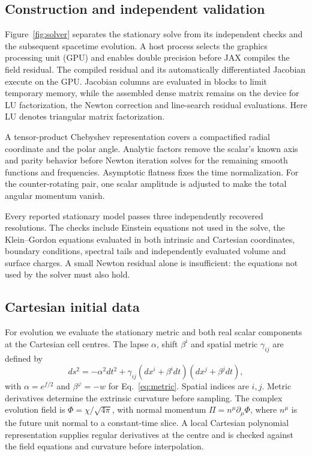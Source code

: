 \documentclass[10pt,twocolumn,floatfix,aps,prd,superscriptaddress,nofootinbib]{revtex4-2}
\begin{document}
\subsection{Construction and independent validation}

Figure~\ref{fig:solver} separates the stationary solve from its independent
checks and the subsequent spacetime evolution. A host process selects the
graphics processing unit (GPU) and enables double precision before JAX
compiles the field residual. The compiled residual and its automatically
differentiated Jacobian execute on the GPU. Jacobian columns are evaluated
in blocks to limit temporary memory, while the assembled dense matrix remains
on the device for LU factorization, the Newton correction and line-search
residual evaluations. Here LU denotes triangular matrix factorization.

A tensor-product Chebyshev representation covers a compactified radial
coordinate and the polar angle. Analytic factors remove the scalar's known
axis and parity behavior before Newton iteration solves for the remaining
smooth functions and frequencies. Asymptotic flatness fixes the time
normalization. For the counter-rotating pair, one scalar amplitude is adjusted
to make the total angular momentum vanish.

Every reported stationary model passes three independently recovered
resolutions. The checks include Einstein equations not used in the solve,
the Klein--Gordon equations evaluated in both intrinsic and Cartesian
coordinates, boundary conditions, spectral tails and independently evaluated
volume and surface charges. A small Newton residual alone is insufficient:
the equations not used by the solver must also hold.



\subsection{Cartesian initial data}

For evolution we evaluate the stationary metric and both real scalar
components at the Cartesian cell centres. The lapse $\alpha$, shift
$\beta^i$ and spatial metric $\gamma_{ij}$ are defined by
\begin{equation}
 ds^2=-\alpha^2dt^2+\gamma_{ij}(dx^i+\beta^idt)(dx^j+\beta^jdt),
 \label{eq:threeplusone}
\end{equation}
with $\alpha=e^{f/2}$ and $\beta^\varphi=-w$ for Eq.~\eqref{eq:metric}.
Spatial indices are $i,j$. Metric derivatives determine the extrinsic
curvature before sampling. The complex evolution field is
$\Phi=\chi/\sqrt{4\pi}$, with normal momentum
$\Pi=n^\mu\partial_\mu\Phi$, where $n^\mu$ is the future unit normal to a
constant-time slice. A local Cartesian polynomial representation supplies
regular derivatives at the centre and is checked against the field equations
and curvature before interpolation.
\end{document}

